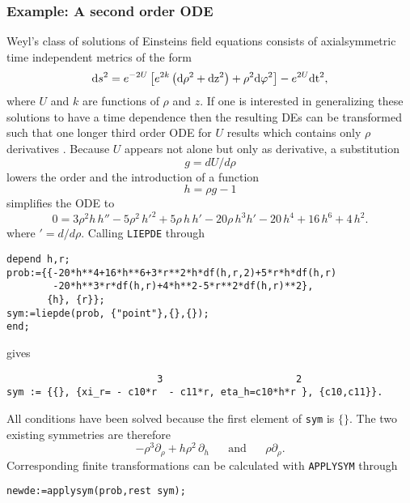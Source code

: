 \subsubsection{Example: A second order ODE}
Weyl's class of solutions of Einsteins field equations consists of
axialsymmetric time independent metrics of the form
\begin{equation}
{\rm{d}} s^2 = e^{-2 U} \left[ e^{2 k}  \left( \rm{d} \rho^2 + \rm{d}
z^2 \right)+\rho^2 \rm{d} \varphi^2 \right] - e^{2 U} \rm{d} t^2,
\end{equation}
where $U$ and $k$ are functions of $\rho$ and $z$. If one is interested in
generalizing these solutions to have a time dependence then the resulting
DEs can be transformed such that one longer third order ODE for $U$ results
which contains only $\rho$ derivatives \cite{Markus}. Because $U$ appears
not alone but only as derivative, a substitution
\begin{equation}
g = dU/d\rho      \label{g1dgl}
\end{equation}
lowers the order and the introduction of a function
\begin{equation}
h = \rho g - 1    \label{g2dgl}
\end{equation}
simplifies the ODE to
\begin{equation}
0 = 3\rho^2h\,h''
-5\rho^2\,h'^2+5\rho\,h\,h'-20\rho\,h^3h'-20\,h^4+16\,h^6+4\,h^2. \label{hdgl}
\end{equation}
where $'= d/d\rho$.
Calling \texttt{LIEPDE} through
\small \begin{verbatim}
depend h,r;
prob:={{-20*h**4+16*h**6+3*r**2*h*df(h,r,2)+5*r*h*df(h,r)
        -20*h**3*r*df(h,r)+4*h**2-5*r**2*df(h,r)**2},
       {h}, {r}};
sym:=liepde(prob, {"point"},{},{});
end; \end{verbatim} \normalsize
gives \small \begin{verbatim}
                          3                       2
sym := {{}, {xi_r= - c10*r  - c11*r, eta_h=c10*h*r }, {c10,c11}}.
\end{verbatim} \normalsize
All conditions have been solved because the first element of \texttt{sym}
is $\{\}$. The two existing symmetries are therefore
\begin{equation}
  - \rho^3 \partial_{\rho} +  h \rho^2 \,\partial_{h} \;\;\;\;\;\;\mbox{and}
  \;\;\;\;\;\;\rho \partial_{\rho}.
\end{equation}
Corresponding finite
transformations can be calculated with \texttt{APPLYSYM} through
\small \begin{verbatim}
newde:=applysym(prob,rest sym);
\end{verbatim} \normalsize
